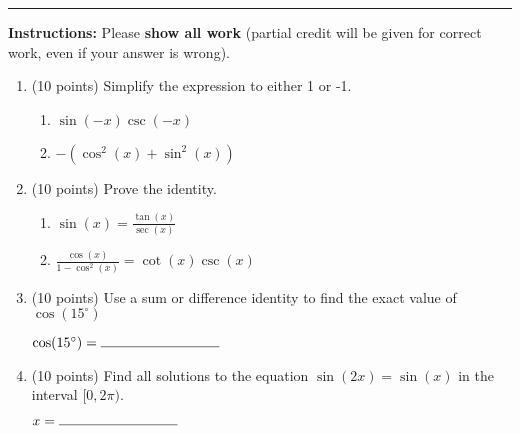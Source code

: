 \documentclass[11pt]{article}
\begin{document}
\Large


\medskip\hrule
\vspace{10pt}

\noindent \textbf{Instructions:} Please \textbf{show all work} (partial credit will be given for correct work, even if your answer is wrong).


\begin{enumerate}

\item (10 points) Simplify the expression to either 1 or -1.

\begin{enumerate}[itemsep=60pt, label={\alph*)}]
    \item $\displaystyle \sin(-x) \csc(-x) $
    \item $\displaystyle -(\cos^2(x) + \sin^2(x)) $
\end{enumerate}
\vspace{60pt}

\item (10 points) Prove the identity.
\begin{multicols}{2}
\begin{enumerate}[itemsep=60pt, label={\alph*)}]
    \item $\displaystyle \sin(x) = \frac{\tan(x)}{\sec(x)}$
    \item $\displaystyle \frac{\cos(x)}{1 - \cos^2(x)} = \cot(x) \csc(x)$
\end{enumerate}
\end{multicols}

\newpage

\item (10 points) Use a sum or difference identity to find the exact value of $\cos(15^{\circ})$
\vspace{100pt}
\begin{flushright}
$\cos(15^{\circ})= \rule{3cm}{0.4pt}$
\end{flushright}
\vspace{20pt}

\item (10 points) Find all solutions to the equation $\sin(2x) = \sin(x)$ in the interval $[0,2\pi )$.
\vspace{100pt}
\begin{flushright}
$x= \rule{3cm}{0.4pt}$
\end{flushright}
\vspace{20pt}



\end{enumerate}
\end{document}
